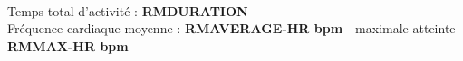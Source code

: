 \documentclass[a4paper,french,11pt]{report}
\begin{document}
\\
\textbullet Temps total d'activité : \textbf{RMDURATION} \\
\textbullet Fréquence cardiaque moyenne : \textbf{RMAVERAGE-HR bpm} - maximale atteinte \textbf{RMMAX-HR bpm}\\

\end{document}
